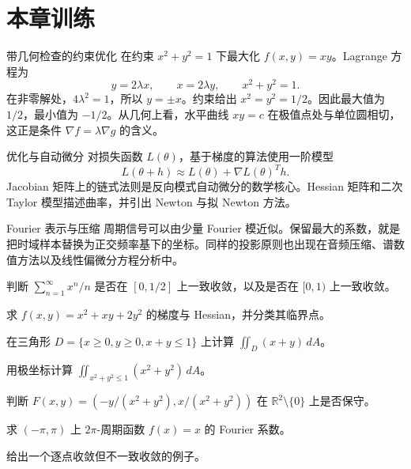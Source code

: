\section{本章训练}

\begin{workedexample}{带几何检查的约束优化}
在约束 $x^2+y^2=1$ 下最大化 $f(x,y)=xy$。Lagrange 方程为
\[
    y=2\lambda x,
    \qquad
    x=2\lambda y,
    \qquad
    x^2+y^2=1.
\]
在非零解处，$4\lambda^2=1$，所以 $y=\pm x$。约束给出 $x^2=y^2=1/2$。因此最大值为 $1/2$，最小值为 $-1/2$。从几何上看，水平曲线 $xy=c$ 在极值点处与单位圆相切，这正是条件 $\nabla f=\lambda\nabla g$ 的含义。
\end{workedexample}

\begin{applicationbox}{优化与自动微分}
对损失函数 $L(\theta)$，基于梯度的算法使用一阶模型
\[
    L(\theta+h)\approx L(\theta)+\nabla L(\theta)^Th.
\]
Jacobian 矩阵上的链式法则是反向模式自动微分的数学核心。Hessian 矩阵和二次 Taylor 模型描述曲率，并引出 Newton 与拟 Newton 方法。
\end{applicationbox}

\begin{applicationbox}{Fourier 表示与压缩}
周期信号可以由少量 Fourier 模近似。保留最大的系数，就是把时域样本替换为正交频率基下的坐标。同样的投影原则也出现在音频压缩、谱数值方法以及线性偏微分方程分析中。
\end{applicationbox}

\begin{chapterexercises}
    \item 判断 $\sum_{n=1}^\infty x^n/n$ 是否在 $[0,1/2]$ 上一致收敛，以及是否在 $[0,1)$ 上一致收敛。
    \item 求 $f(x,y)=x^2+xy+2y^2$ 的梯度与 Hessian，并分类其临界点。
    \item 在三角形 $D=\{x\ge0,y\ge0,x+y\le1\}$ 上计算 $\iint_D(x+y)\,dA$。
    \item 用极坐标计算 $\iint_{x^2+y^2\le1}(x^2+y^2)\,dA$。
    \item 判断 $F(x,y)=(-y/(x^2+y^2),x/(x^2+y^2))$ 在 $\mathbb{R}^2\setminus\{0\}$ 上是否保守。
    \item 求 $(-\pi,\pi)$ 上 $2\pi$-周期函数 $f(x)=x$ 的 Fourier 系数。
    \item 给出一个逐点收敛但不一致收敛的例子。
\end{chapterexercises}

